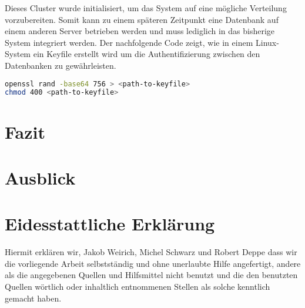 \documentclass{article}
\begin{document}
Dieses Cluster wurde initialisiert, um das System auf eine mögliche Verteilung vorzubereiten. Somit kann zu einem späteren Zeitpunkt eine Datenbank auf einem anderen Server betrieben werden und muss lediglich in das bisherige System integriert werden. Der nachfolgende Code zeigt, wie in einem Linux-System ein Keyfile erstellt wird um die Authentifizierung zwischen den Datenbanken zu gewährleisten.\\
\begin{lstlisting}[language=bash]
openssl rand -base64 756 > <path-to-keyfile>
chmod 400 <path-to-keyfile>
\end{lstlisting}

\newpage
\section{Fazit}


\section{Ausblick}

\newpage

\listoffigures
\newpage

\printbibliography
\newpage

\section*{Eidesstattliche Erklärung}
Hiermit erklären wir, Jakob Weirich, Michel Schwarz und Robert Deppe dass wir die vorliegende Arbeit selbstständig und ohne unerlaubte Hilfe angefertigt, andere als die angegebenen Quellen und Hilfsmittel nicht benutzt und die den benutzten Quellen wörtlich oder inhaltlich entnommenen Stellen als solche kenntlich gemacht haben.


\newpage
\end{document}
